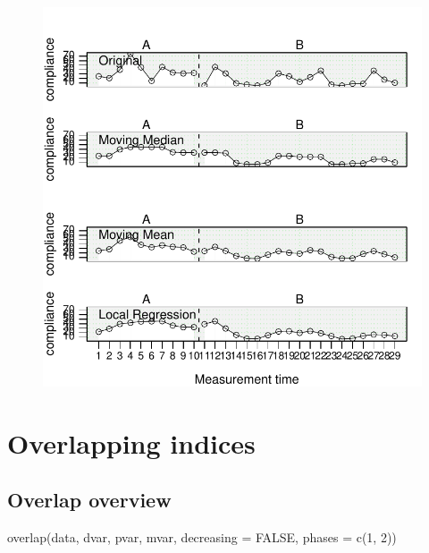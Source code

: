 \documentclass[
  letterpaper,
  DIV=11,
  numbers=noendperiod]{scrreprt}
\begin{document}
\begin{figure}[H]

{\centering \includegraphics{./ch_describe_manipulate_files/figure-pdf/smooth_example-1.pdf}

}

\end{figure}

\hypertarget{overlapping-indices}{%
\chapter{Overlapping indices}\label{overlapping-indices}}

\hypertarget{overlap-overview}{%
\section{Overlap overview}\label{overlap-overview}}

\begin{tcolorbox}[enhanced jigsaw, toprule=.15mm, colframe=quarto-callout-tip-color-frame, left=2mm, colback=white, breakable, bottomrule=.15mm, arc=.35mm, rightrule=.15mm, leftrule=.75mm, opacityback=0]
\begin{minipage}[t]{5.5mm}
\textcolor{quarto-callout-tip-color}{\faLightbulb}
\end{minipage}%
\begin{minipage}[t]{\textwidth - 5.5mm}
overlap(data, dvar, pvar, mvar, decreasing = FALSE, phases = c(1,
2))\end{minipage}%
\end{tcolorbox}
\end{document}
